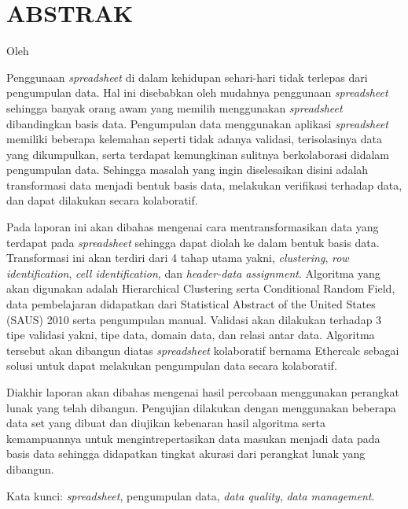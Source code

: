 \clearpage
\chapter*{ABSTRAK}
\begin{center}
\MakeTextUppercase{\textbf{\large{\thetitle}}}

Oleh

\MakeTextUppercase{\theauthor}
\end{center}
\medskip
\begin{spacing}{1.0}
Penggunaan \textit{spreadsheet} di dalam kehidupan sehari-hari tidak terlepas dari pengumpulan data. Hal ini disebabkan oleh mudahnya penggunaan \textit{spreadsheet} sehingga banyak orang awam yang memilih menggunakan \textit{spreadsheet} dibandingkan basis data. Pengumpulan data menggunakan aplikasi \textit{spreadsheet} memiliki beberapa kelemahan seperti tidak adanya validasi, terisolasinya data yang dikumpulkan, serta terdapat kemungkinan sulitnya berkolaborasi didalam pengumpulan data. Sehingga masalah yang ingin diselesaikan disini adalah transformasi data menjadi bentuk basis data, melakukan verifikasi terhadap data, dan dapat dilakukan secara kolaboratif.

Pada laporan ini akan dibahas mengenai cara mentransformasikan data yang terdapat pada \textit{spreadsheet} sehingga dapat diolah ke dalam bentuk basis data. Transformasi ini akan terdiri dari 4 tahap utama yakni, \textit{clustering}, \textit{row identification}, \textit{cell identification}, dan \textit{header-data assignment}. Algoritma yang akan digunakan adalah Hierarchical Clustering serta Conditional Random Field, data pembelajaran didapatkan dari Statistical Abstract of the United States (SAUS) 2010 serta pengumpulan manual. Validasi akan dilakukan terhadap 3 tipe validasi yakni, tipe data, domain data, dan relasi antar data. Algoritma tersebut akan dibangun diatas \textit{spreadsheet} kolaboratif bernama Ethercalc sebagai solusi untuk dapat melakukan pengumpulan data secara kolaboratif.

Diakhir laporan akan dibahas mengenai hasil percobaan menggunakan perangkat lunak yang telah dibangun. Pengujian dilakukan dengan menggunakan beberapa data set yang dibuat dan diujikan kebenaran hasil algoritma serta kemampuannya untuk mengintrepertasikan data masukan menjadi data pada basis data sehingga didapatkan tingkat akurasi dari perangkat lunak yang dibangun.

Kata kunci: \textit{spreadsheet}, pengumpulan data, \textit{data quality}, \textit{data management}.
\end{spacing}

\clearpage